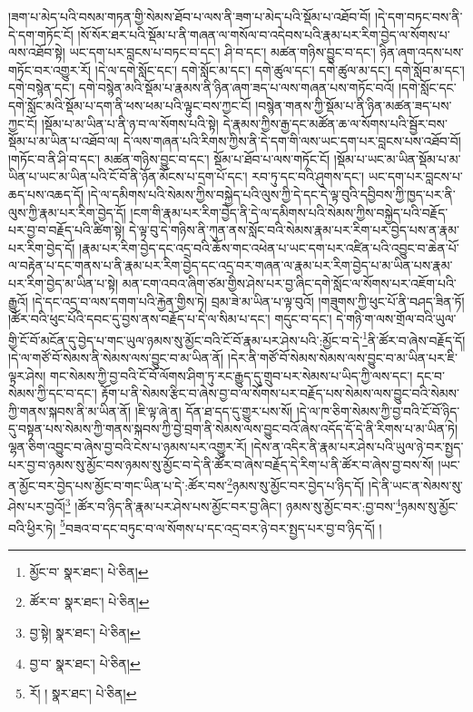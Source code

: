 །ཟག་པ་མེད་པའི་བསམ་གཏན་གྱི་སེམས་ཐོབ་པ་ལས་ནི་ཟག་པ་མེད་པའི་སྡོམ་པ་འཐོབ་བོ། །དེ་དག་བཏང་བས་ནི་དེ་དག་གཏོང་ངོ། །སོ་སོར་ཐར་པའི་སྡོམ་པ་ནི་གཞན་ལ་གསོལ་བ་འདེབས་པའི་རྣམ་པར་རིག་བྱེད་ལ་སོགས་པ་ལས་འཐོབ་སྟེ། ཡང་དག་པར་བླངས་པ་བཏང་བ་དང་། ཤི་བ་དང་། མཚན་གཉིས་བྱུང་བ་དང་། ཉིན་ཞག་འདས་པས་གཏོང་བར་འགྱུར་རོ། །དེ་ལ་དགེ་སློང་དང་། དགེ་སློང་མ་དང་། དགེ་ཚུལ་དང་། དགེ་ཚུལ་མ་དང་། དགེ་སློབ་མ་དང་། དགེ་བསྙེན་དང་། དགེ་བསྙེན་མའི་སྡོམ་པ་རྣམས་ནི་ཉིན་ཞག་ཟད་པ་ལས་གཞན་པས་གཏོང་བའོ། །དགེ་སློང་དང་དགེ་སློང་མའི་སྡོམ་པ་དག་ནི་ཕས་ཕམ་པའི་ལྟུང་བས་ཀྱང་ངོ། །བསྙེན་གནས་ཀྱི་སྡོམ་པ་ནི་ཉིན་མཚན་ཟད་པས་ཀྱང་ངོ། །སྡོམ་པ་མ་ཡིན་པ་ནི་ཉ་བ་ལ་སོགས་པའི་སྟེ། དེ་རྣམས་ཀྱིས་རྒྱ་དང་མཚོན་ཆ་ལ་སོགས་པའི་སྦྱོར་བས་སྡོམ་པ་མ་ཡིན་པ་འཐོབ་ལ། དེ་ལས་གཞན་པའི་རིགས་ཀྱིས་ནི་དེ་དག་གི་ལས་ཡང་དག་པར་བླངས་པས་འཐོབ་བོ། །གཏོང་བ་ནི་ཤི་བ་དང་། མཚན་གཉིས་བྱུང་བ་དང་། སྡོམ་པ་ཐོབ་པ་ལས་གཏོང་ངོ། །སྡོམ་པ་ཡང་མ་ཡིན་སྡོམ་པ་མ་ཡིན་པ་ཡང་མ་ཡིན་པའི་ངོ་བོ་ནི་ཉོན་མོངས་པ་དྲག་པོ་དང་། རབ་ཏུ་དང་བའི་ཤུགས་དང་། ཡང་དག་པར་བླངས་པ་ཆད་པས་འཆད་དོ། །དེ་ལ་དམིགས་པའི་སེམས་ཀྱིས་བསྐྱེད་པའི་ལུས་ཀྱི་དེ་དང་དེ་ལྟ་བུའི་དབྱིབས་ཀྱི་ཁྱད་པར་ནི་ལུས་ཀྱི་རྣམ་པར་རིག་བྱེད་དོ། །ངག་གི་རྣམ་པར་རིག་བྱེད་ནི་དེ་ལ་དམིགས་པའི་སེམས་ཀྱིས་བསྐྱེད་པའི་བརྗོད་པར་བྱ་བ་བརྗོད་པའི་ཚིག་སྟེ། དེ་ལྟ་བུ་དེ་གཉིས་ནི་ཀུན་ནས་སློང་བའི་སེམས་རྣམ་པར་རིག་པར་བྱེད་པས་ན་རྣམ་པར་རིག་བྱེད་དོ། །རྣམ་པར་རིག་བྱེད་དང་འདྲ་བའི་ཆོས་གང་འཕེན་པ་ཡང་དག་པར་འཛིན་པའི་འབྱུང་བ་ཆེན་པོ་ལ་བརྟེན་པ་དང་གནས་པ་ནི་རྣམ་པར་རིག་བྱེད་དང་འདྲ་བར་གཞན་ལ་རྣམ་པར་རིག་བྱེད་པ་མ་ཡིན་པས་རྣམ་པར་རིག་བྱེད་མ་ཡིན་པ་སྟེ། མན་ངག་འབའ་ཞིག་ཙམ་གྱིས་ཤེས་པར་བྱ་ཞིང་དགེ་སློང་ལ་སོགས་པར་འཇོག་པའི་རྒྱུའོ། །དེ་དང་འདྲ་བ་ལས་དགག་པའི་རྐྱེན་གྱིས་ཏེ། བྲམ་ཟེ་མ་ཡིན་པ་ལྟ་བུའོ། །གཟུགས་ཀྱི་ཕུང་པོ་ནི་བཤད་ཟིན་ཏོ། །ཚོར་བའི་ཕུང་པོའི་དབང་དུ་བྱས་ནས་བརྗོད་པ་དེ་ལ་སིམ་པ་དང་། གདུང་བ་དང་། དེ་གཉི་ག་ལས་གྲོལ་བའི་ཡུལ་གྱི་ངོ་བོ་མངོན་དུ་བྱེད་པ་གང་ཡུལ་ཉམས་སུ་མྱོང་བའི་ངོ་བོ་རྣམ་པར་ཤེས་པའི་:མྱོང་བ་དེ་\footnote{མྱོང་བ་  སྣར་ཐང་།  པེ་ཅིན། }ནི་ཚོར་བ་ཞེས་བརྗོད་དོ། །དེ་ལ་གཙོ་བོ་སེམས་ནི་སེམས་ལས་བྱུང་བ་མ་ཡིན་ནོ། །དེར་ནི་གཙོ་བོ་སེམས་སེམས་ལས་བྱུང་བ་མ་ཡིན་པར་ཇི་ལྟར་ཤེས། གང་སེམས་ཀྱི་བྱ་བའི་ངོ་བོ་ལོགས་ཤིག་ཏུ་རང་རྒྱུད་དུ་གྲུབ་པར་སེམས་པ་ཡིད་ཀྱི་ལས་དང་། དང་བ་སེམས་ཀྱི་དང་བ་དང་། རྟོག་པ་ནི་སེམས་རྩིང་བ་ཞེས་བྱ་བ་ལ་སོགས་པར་བརྗོད་པས་སེམས་ལས་བྱུང་བའི་སེམས་ཀྱི་གནས་སྐབས་ནི་མ་ཡིན་ནོ། །ཇི་ལྟ་ཞེ་ན། དོན་ཐ་དད་དུ་གྱུར་པས་སོ། །དེ་ལ་ཁ་ཅིག་སེམས་ཀྱི་བྱ་བའི་ངོ་བོ་ཉིད་དུ་བསྟན་པས་སེམས་ཀྱི་གནས་སྐབས་ཀྱི་བྱེ་བྲག་ནི་སེམས་ལས་བྱུང་བའོ་ཞེས་འདོད་དོ་དེ་ནི་རིགས་པ་མ་ཡིན་ཏེ། ལྷན་ཅིག་འབྱུང་བ་ཞེས་བྱ་བའི་ངེས་པ་ཉམས་པར་འགྱུར་རོ། །དེས་ན་འདིར་ནི་རྣམ་པར་ཤེས་པའི་ཡུལ་ཉེ་བར་སྤྱད་པར་བྱ་བ་ཉམས་སུ་མྱོང་བས་ཉམས་སུ་མྱོང་བ་དེ་ནི་ཚོར་བ་ཞེས་བརྗོད་དེ་རིག་པ་ནི་ཚོར་བ་ཞེས་བྱ་བས་སོ། །ཡང་ན་མྱོང་བར་བྱེད་པས་མྱོང་བ་གང་ཡིན་པ་དེ་:ཚོར་བས་\footnote{ཚོར་བ་  སྣར་ཐང་།  པེ་ཅིན། }ཉམས་སུ་མྱོང་བར་བྱེད་པ་ཉིད་དོ། །དེ་ནི་ཡང་ན་སེམས་སུ་ཤེས་པར་བྱའོ།\footnote{བྱ་སྟེ།  སྣར་ཐང་།  པེ་ཅིན། } །ཚོར་བ་ཉིད་ནི་རྣམ་པར་ཤེས་པས་མྱོང་བར་བྱ་ཞིང་། ཉམས་སུ་མྱོང་བར་:བྱ་བས་\footnote{བྱ་བ་  སྣར་ཐང་།  པེ་ཅིན། }ཉམས་སུ་མྱོང་བའི་ཕྱིར་ཏེ། \footnote{རོ། །   སྣར་ཐང་།  པེ་ཅིན། }བཟའ་བ་དང་བཏུང་བ་ལ་སོགས་པ་དང་འདྲ་བར་ཉེ་བར་སྤྱད་པར་བྱ་བ་ཉིད་དོ། །
